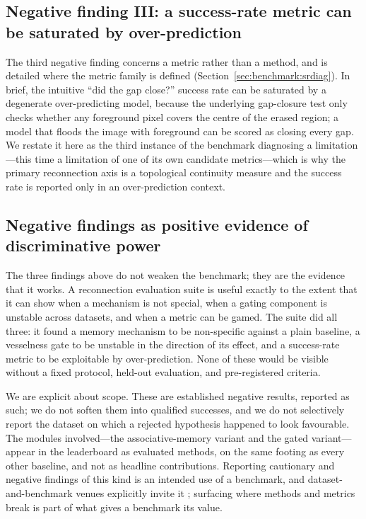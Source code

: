 \subsection{Negative finding III: a success-rate metric can be saturated by over-prediction}
\label{sec:diagnostics:metric}

The third negative finding concerns a metric rather than a method, and is
detailed where the metric family is defined
(Section~\ref{sec:benchmark:srdiag}). In brief, the intuitive ``did the gap
close?'' success rate can be saturated by a degenerate over-predicting model,
because the underlying gap-closure test only checks whether any foreground
pixel covers the centre of the erased region; a model that floods the image
with foreground can be scored as closing every gap. We restate it here as the
third instance of the benchmark diagnosing a limitation---this time a
limitation of one of its own candidate metrics---which is why the primary
reconnection axis is a topological continuity measure and the success rate is
reported only in an over-prediction context.

\subsection{Negative findings as positive evidence of discriminative power}
\label{sec:diagnostics:positive}

The three findings above do not weaken the benchmark; they are the evidence
that it works. A reconnection evaluation suite is useful exactly to the extent
that it can show when a mechanism is not special, when a gating component is
unstable across datasets, and when a metric can be gamed. The suite did all
three: it found a memory mechanism to be non-specific against a plain
baseline, a vesselness gate to be unstable in the direction of its effect, and
a success-rate metric to be exploitable by over-prediction. None of these
would be visible without a fixed protocol, held-out evaluation, and
pre-registered criteria.

We are explicit about scope. These are established negative results, reported
as such; we do not soften them into qualified successes, and we do not
selectively report the dataset on which a rejected hypothesis happened to look
favourable. The modules involved---the associative-memory variant and the
gated variant---appear in the leaderboard as evaluated methods, on the same
footing as every other baseline, and not as headline contributions. Reporting
cautionary and negative findings of this kind is an intended use of a
benchmark, and dataset-and-benchmark venues explicitly invite it
\cite{TODO_dandb_negative}; surfacing where methods and metrics break is part
of what gives a benchmark its value.
